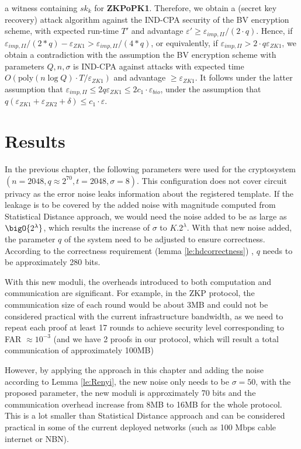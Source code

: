 a witness containing $sk_k$ for \textbf{ZKPoPK1}. Therefore, we obtain a (secret
key recovery) attack algorithm against the IND-CPA security of the BV encryption
scheme, with expected run-time $T'$ and advantage
$\varepsilon' \geq \varepsilon_{imp,II}/(2 \cdot q)$. Hence, if
$\varepsilon_{imp,II}/(2*q) - \varepsilon_{ZK1} > \varepsilon_{imp,II}/(4*q)$,
or equivalently, if $\varepsilon_{imp,II} > 2 \cdot q \varepsilon_{ZK1}$, we
obtain a contradiction with the assumption the BV encryption scheme with
parameters $Q,n,\sigma$ is IND-CPA against attacks with expected time
$O(\mathrm{poly}(n \log Q) \cdot T / \varepsilon_{ZK1})$ and advantage
$\geq \varepsilon_{ZK1}$. It follows under the latter assumption that
$\varepsilon_{imp,II} \leq 2q \varepsilon_{ZK1} \leq 2 c_1 \cdot
\varepsilon_{bio}$, under the assumption that
$q(\varepsilon_{ZK1}+\varepsilon_{ZK2} + \delta) \leq c_1 \cdot \varepsilon$.

\section{Results}
\label{sec:secProcResult}
In the previous chapter, the following parameters were used for the cryptosystem
$(n = 2048, q \approx 2^{70}, t = 2048, \sigma = 8)$. This configuration does
not cover circuit privacy as the error noise leaks information about the
registered template. If the leakage is to be covered by the added noise with
magnitude computed from Statistical Distance approach, we would need the noise
added to be as large as $\bigO{2^{\lambda}}$, which results the increase of
$\sigma$ to $K.2^{\lambda}$. With that new noise added, the parameter $q$ of the
system need to be adjusted to ensure correctness. According to the correctness
requirement (lemma \ref{le:hdcorrectness}) , $q$ needs to be approximately 280
bits.

With this new moduli, the overheads introduced to both computation and
communication are significant. For example, in the ZKP protocol, the
communication size of each round would be about 3MB and could not be considered
practical with the current infrastructure bandwidth, as we need to repeat each
proof at least 17 rounds to achieve security level corresponding to FAR $\approx 10^{-3}$ (and we have 2 proofs in our protocol, which will
result a total communication of approximately 100MB)

However, by applying the approach in this chapter and adding the noise according
to Lemma \ref{le:Renyi}, the new noise only needs to be $\sigma = 50$, with the
proposed parameter, the new moduli is approximately 70 bits and the
communication overhead increase from 8MB to 16MB for the whole protocol. This is
a lot smaller than Statistical Distance approach and can be considered practical
in some of the current deployed networks (such as 100 Mbps cable internet or
NBN).

